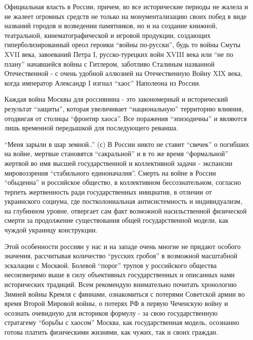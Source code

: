 Официальная власть в России, причем, во все исторические периоды не жалела и не
жалеет огромных средств не только на монументализацию своих побед в виде
названий городов и возведении памятников, но и на создание книжной,
театральной, кинематографической и игровой продукции, создающих
гиперболизированный ореол героики \enquote{войны по-русски}, будь то войны Смуты XVII
века, завоеваний Петра I, русско-турецких войн XVIII века или \enquote{не по плану}
начавшейся войны с Гитлером, заботливо Сталиным названной Отечественной - с
очень удобной аллюзией на Отечественную Войну XIX века, когда император
Александр I изгнал \enquote{хаос} Наполеона из России.

Каждая война Москвы для россиянина - это закономерный и исторический результат
\enquote{защиты}, которая увеличивает \enquote{национальную} территорию влияния, отодвигая от
столицы \enquote{фронтир хаоса}. Все поражения \enquote{эпизодичны} и являются лишь временной
передышкой для последующего реванша.

\enquote{Меня зарыли в шар земной..} (с) В России никто не ставит \enquote{свечек} о погибших
на войне, мертвые становятся \enquote{сакральной} и в то же время \enquote{формальной} жертвой
во имя высшей государственной и коллективной задачи - экспансии мировоззрения
\enquote{стабильного единоначалия}. Смерть на войне в России \enquote{обыденна} и российское
общество, в коллективном бессознательном, согласно терпеть жертвенность ради
государственных инициатив, в отличии от украинского социума, где
постколониальная антисистемность и индивидуализм, на глубинном уровне,
отвергает сам факт возможной насильственной физической смерти за продолжение
существования общей государственной модели, как чуждой украинцу конструкции.

Этой особенности россиян у нас и на западе очень многие не придают особого
значения, рассчитывая количество \enquote{русских гробов} в возможной масштабной
эскалации с Москвой. Болевой \enquote{порог} трупов у российского общества несоизмеримо
выше в силу объективных государственных и описанных нами исторических традиций.
Всем рекомендую внимательно почитать хронологию Зимней войны Кремля с финнами,
ознакомиться с потерями Советской армии во время Второй Мировой войны, о
потерях РФ в первую Чеченскую войну и осознать очевидную для историков формулу
- за свою государственную стратагему \enquote{борьбы с хаосом} Москва, как
государственная модель, осознанно готова платить физическими жизнями, как
чужих, так и своих граждан.



